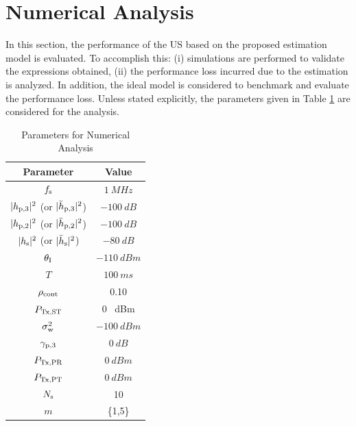 \section{Numerical Analysis} \label{sec_US:num_ana}
In this section, the performance of the US based on the proposed estimation model is evaluated. To accomplish this: (i) simulations are performed to validate the expressions obtained, (ii) the performance loss incurred due to the estimation is analyzed. In addition, the ideal model is considered to benchmark and evaluate the performance loss. %
Unless stated explicitly, the parameters given in Table \ref{tb_US:tb2} are considered for the analysis.%



\begin{table}
\renewcommand{\arraystretch}{1.4}
\caption{Parameters for Numerical Analysis}
\label{tb_US:tb2}
\centering
\begin{tabular}{c||c}
\hline
\bfseries Parameter & \bfseries Value \\
\hline\hline
$f_{\text{s}}$  & $\SI{1}{MHz}$ \\ 
$|h_{\text{p,3}}|^2$ (or $|\bar{h}_{\text{p,3}}|^2$) & $\SI{-100}{dB}$ \\ 
$|h_{\text{p,2}}|^2$ (or $|\bar{h}_{\text{p,2}}|^2$) & $\SI{-100}{dB}$ \\ 
$|h_{\text{s}}|^2$ (or $|\bar{h}_{\text{s}}|^2$) & $\SI{-80}{dB}$ \\ 
$\theta_{\text{I}}$ & $\SI{-110}{dBm}$ \\ 
$T$ & $\SI{100}{ms}$ \\ 
$\rho_{\text{cont}}$ & 0.10 \\ 
$P_{\text{Tx,ST}}$ & 0 \SI{}{dBm} \\ 
$\sigma^2_{\text{w}}$ & $\SI{-100}{dBm}$ \\ 
${\gamma}_{\text{p,3}}$ & $\SI{0}{dB}$ \\ 
$P_{\text{Tx,PR}}$ & $\SI{0}{dBm}$ \\ 
$P_{\text{Tx,PT}}$ & $\SI{0}{dBm}$ \\ 
$N_{\text{s}}$ & 10 \\ 
$m$ & \{1,5\} \\ \hline
\end{tabular}%
\end{table}

